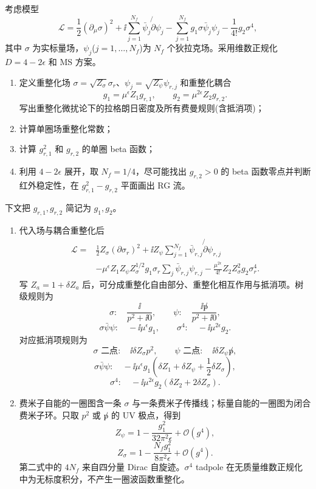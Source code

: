 \begin{question}[20 分]
考虑模型
\[
\mathcal L=\frac12(\partial_\mu\sigma)^2
+\ii\sum_{j=1}^{N_f}\bar\psi_j\not{\partial}\psi_j
-\sum_{j=1}^{N_f}g_1\sigma\bar\psi_j\psi_j
-\frac1{4!}g_2\sigma^4,
\]
其中 $\sigma$ 为实标量场，$\psi_j$($j=1,\ldots,N_f$)为 $N_f$ 个狄拉克场。采用维数正规化 $D=4-2\epsilon$ 和 MS 方案。
\begin{enumerate}
  \item 定义重整化场 $\sigma=\sqrt{Z_\sigma}\sigma_r$、$\psi_j=\sqrt{Z_\psi}\psi_{r,j}$ 和重整化耦合
  \[
  g_1=\mu^\epsilon Z_1g_{r,1},\qquad
  g_2=\mu^{2\epsilon}Z_2g_{r,2}.
  \]
  写出重整化微扰论下的拉格朗日密度及所有费曼规则(含抵消项)；
  \item 计算单圈场重整化常数；
  \item 计算 $g_{r,1}^2$ 和 $g_{r,2}$ 的单圈 beta 函数；
  \item 利用 $4-2\epsilon$ 展开，取 $N_f=1/4$，尽可能找出 $g_{r,2}>0$ 的 beta 函数零点并判断红外稳定性，在 $g_{r,1}^2-g_{r,2}$ 平面画出 RG 流。
\end{enumerate}
\begin{solution}
下文把 $g_{r,1},g_{r,2}$ 简记为 $g_1,g_2$。
\begin{enumerate}
  \item 代入场与耦合重整化后
  \[
  \begin{aligned}
  \mathcal L={}&\frac12Z_\sigma(\partial\sigma_r)^2
  +\ii Z_\psi\sum_{j=1}^{N_f}\bar\psi_{r,j}\not{\partial}\psi_{r,j}\\
  &-\mu^\epsilon Z_1Z_\psi Z_\sigma^{1/2}g_1
  \sigma_r\sum_j\bar\psi_{r,j}\psi_{r,j}
  -\frac{\mu^{2\epsilon}}{4!}Z_2Z_\sigma^2g_2\sigma_r^4.
  \end{aligned}
  \]
  写 $Z_a=1+\delta Z_a$ 后，可分成重整化自由部分、重整化相互作用与抵消项。树级规则为
  \[
  \sigma:\quad \frac{\ii}{p^2+\ii0},
  \qquad
  \psi:\quad \frac{\ii\not p}{p^2+\ii0},
  \]
  \[
  \sigma\bar\psi\psi:\quad -\ii\mu^\epsilon g_1,
  \qquad
  \sigma^4:\quad -\ii\mu^{2\epsilon}g_2.
  \]
  对应抵消项规则为
  \[
  \sigma\text{ 二点}:\quad \ii\delta Z_\sigma p^2,
  \qquad
  \psi\text{ 二点}:\quad \ii\delta Z_\psi\not p,
  \]
  \[
  \sigma\bar\psi\psi:\quad
  -\ii\mu^\epsilon g_1
  \left(\delta Z_1+\delta Z_\psi+\frac12\delta Z_\sigma\right),
  \]
  \[
  \sigma^4:\quad
  -\ii\mu^{2\epsilon}g_2
  \left(\delta Z_2+2\delta Z_\sigma\right).
  \]

  \item 费米子自能的一圈图含一条 $\sigma$ 与一条费米子传播线；标量自能的一圈图为闭合费米子环。只取 $p^2$ 或 $\not p$ 的 UV 极点，得到
  \[
  \boxed{Z_\psi=1-\frac{g_1^2}{32\pi^2\epsilon}+\mathcal O(g^4)},
  \]
  \[
  \boxed{Z_\sigma=1-\frac{N_f g_1^2}{8\pi^2\epsilon}+\mathcal O(g^4)}.
  \]
  第二式中的 $4N_f$ 来自四分量 Dirac 自旋迹。$\sigma^4$ tadpole 在无质量维数正规化中为无标度积分，不产生一圈波函数重整化。


\end{enumerate}
\end{solution}
\end{question}
